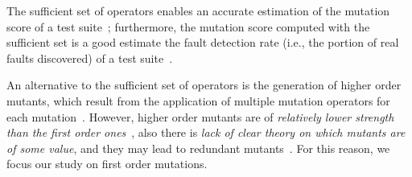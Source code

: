 The sufficient set of operators enables an accurate estimation of the mutation score of a test suite~\cite{siami2008sufficient}; furthermore, the mutation score computed with the sufficient set is a good estimate the fault detection rate (i.e., the portion of real faults discovered) of a test suite~\cite{andrews2005mutation}.







An alternative to the sufficient set of operators is the generation of higher order mutants, which result from the application of multiple mutation operators for each mutation~\cite{jia2009higher,kintis2010evaluating,offutt1992investigations,papadakis2010empirical}. However, higher order mutants are of \emph{relatively lower strength than the first order ones}~\cite{papadakis2010mutation,papadakis2019mutation}, also there is \emph{lack of clear theory on which mutants are of some value}, and they may lead to redundant mutants~\cite{papadakis2019mutation}. For this reason, we focus our study on first order mutations.

%
%
%


%
%

